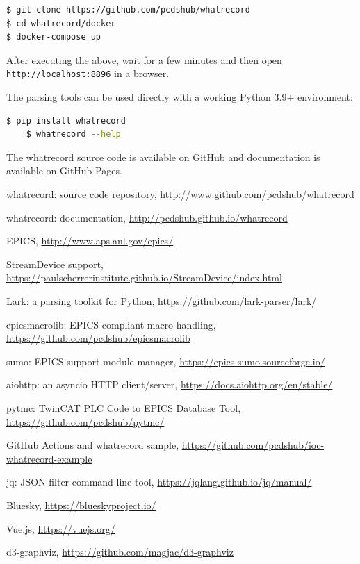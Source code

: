 \documentclass[letter,
               keeplastbox,   %
               ]{jacow}
\begin{document}
\begin{lstlisting}[language=bash]
$ git clone https://github.com/pcdshub/whatrecord
$ cd whatrecord/docker
$ docker-compose up
\end{lstlisting}
After executing the above, wait for a few minutes and then open
\verb_http://localhost:8896_ in a browser.

The parsing tools can be used directly with a working Python 3.9+ environment:

\begin{lstlisting}[language=bash]
	$ pip install whatrecord
	$ whatrecord --help
\end{lstlisting}

The whatrecord source code is available on GitHub\cite{whatrecord-github}
and documentation is available on GitHub Pages\cite{whatrecord-docs}.

%
	{\printbibliography}%
	{%
	
	\begin{thebibliography}{9} %
	
    whatrecord: source code repository,
		\url{http://www.github.com/pcdshub/whatrecord}
	
    whatrecord: documentation,
		\url{http://pcdshub.github.io/whatrecord}
	
		EPICS,
		\url{http://www.aps.anl.gov/epics/}
	
		StreamDevice support,
		\url{https://paulscherrerinstitute.github.io/StreamDevice/index.html}
	
		Lark: a parsing toolkit for Python,
		\url{https://github.com/lark-parser/lark/}
	
    epicsmacrolib: EPICS-compliant macro handling,
		\url{https://github.com/pcdshub/epicsmacrolib}
	
		sumo: EPICS support module manager,
		\url{https://epics-sumo.sourceforge.io/}
	
		aiohttp: an asyncio HTTP client/server,
		\url{https://docs.aiohttp.org/en/stable/}
	
    pytmc: TwinCAT PLC Code to EPICS Database Tool,
		\url{https://github.com/pcdshub/pytmc/}
	
		GitHub Actions and whatrecord sample,
		\url{https://github.com/pcdshub/ioc-whatrecord-example}
	
		jq: JSON filter command-line tool,
		\url{https://jqlang.github.io/jq/manual/}
	
    Bluesky,
		\url{https://blueskyproject.io/}
	
    Vue.js,
		\url{https://vuejs.org/}
	
    d3-graphviz,
		\url{https://github.com/magjac/d3-graphviz}
	
	\end{thebibliography}
} %

%
% 

\end{document}
